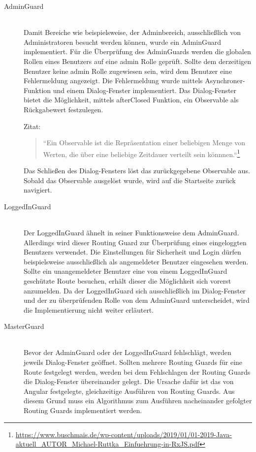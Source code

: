 \begin{description}
	\item[AdminGuard]\hfill\\
	Damit Bereiche wie beispielsweise, der Adminbereich, ausschlie{\ss}lich von Administratoren besucht werden können, wurde ein AdminGuard implementiert. Für die Überprüfung des AdminGuards werden die globalen Rollen eines Benutzers auf eine admin Rolle geprüft. Sollte dem derzeitigen Benutzer keine admin Rolle zugewiesen sein, wird dem Benutzer eine Fehlermeldung angezeigt. Die Fehlermeldung wurde mittels Asynchroner-Funktion und einem Dialog-Fenster implementiert. Das Dialog-Fenster bietet die Möglichkeit, mittels afterClosed Funktion, ein Observable als Rückgabewert festzulegen.

	Zitat:
	 \begin{quote}
		``Ein Observable ist die Repräsentation einer beliebigen Menge von Werten, die über eine beliebige Zeitdauer verteilt sein könnnen.``\footnote{\url{https://www.buschmais.de/wp-content/uploads/2019/01/01-2019-Java-aktuell_AUTOR_Michael-Ruttka_Einfuehrung-in-RxJS.pdf}}
	\end{quote}

	Das Schlie{\ss}en des Dialog-Fensters löst das zurückgegebene Observable aus. Sobald das Observable ausgelöst wurde, wird auf die Startseite zurück navigiert.

	\item[LoggedInGuard]\hfill\\
	Der LoggedInGuard ähnelt in seiner Funktionsweise dem AdminGuard. Allerdings wird dieser Routing Guard zur Überprüfung eines eingeloggten Benutzers verwendet. Die Einstellungen für Sicherheit und Login dürfen beispielsweise ausschlie{\ss}lich als angemeldeter Benutzer eingesehen werden. Sollte ein unangemeldeter Benutzer eine von einem LoggedInGuard geschützte Route besuchen, erhält dieser die Möglichkeit sich vorerst anzumelden. Da der LoggedInGuard sich ausschlie{\ss}lich im Dialog-Fenster und der zu überprüfenden Rolle von dem AdminGuard unterscheidet, wird die Implementierung nicht weiter erläutert.

	\item[MasterGuard]\hfill\\
	Bevor der AdminGuard oder der LoggedInGuard fehlschlägt, werden jeweils Dialog-Fenster geöffnet. Sollten mehrere Routing Guards für eine Route festgelegt werden, werden bei dem Fehlschlagen der Routing Guards die Dialog-Fenster übereinander gelegt. Die Ursache dafür ist das von Angular festgelegte, gleichzeitige Ausführen von Routing Guards. Aus diesem Grund muss ein Algorithmus zum Ausführen nacheinander gefolgter Routing Guards implementiert werden.


\end{description}
